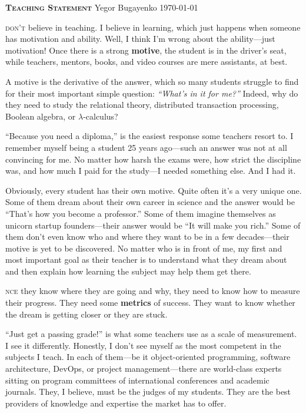 \documentclass{./yb}
\newcommand\first[2]{\vspace{1em}{\setlength{\parindent}{0pt}\bfseries\LARGE #1}\textsc{#2}}
\begin{document}
{\bfseries\scshape Teaching Statement}\newline
Yegor Bugayenko\newline
\today

\vspace*{12pt}

\first{I}{ don't} believe in teaching. I believe in learning, which
just happens when someone has motivation and ability.
Well, I think I'm wrong about the ability---just motivation!
Once there is a strong \textbf{motive}, the student is in the
driver's seat, while teachers, mentors, books, and video
courses are mere assistants, at best.

A motive is the derivative of the answer, which so many students
struggle to find for their most important simple
question: \emph{``What's in it for me?''}
Indeed, why do they need to study
the relational theory, distributed transaction processing,
Boolean algebra, or $\lambda$-calculus?

``Because you need a diploma,'' is the easiest response some
teachers resort to. I remember myself being a student 25 years ago---such
an answer was not at all convincing for me. No matter how harsh
the exams were, how strict the discipline was, and how much I paid
for the study---I needed something else. And I had it.

Obviously, every student has their own motive.
Quite often it's a very unique one.
Some of them dream about their own
career in science and the answer would be ``That's how you
become a professor.'' Some of them imagine themselves as unicorn startup
founders---their answer would be ``It will make you rich.''
Some of them don't even know who and where they want to be in a few
decades---their motive is yet to be discovered.
No matter who is in front of me, my first and most
important goal as their teacher is to understand what they dream about
and then explain how learning the subject may help them get there.

\first{O}{nce} they know where they are going and why, they need
to know how to measure their progress.
They need some \textbf{metrics} of success.
They want to know whether the dream is getting closer or they are stuck.

``Just get a passing grade!'' is what some teachers use as a
scale of measurement. I see it differently. Honestly, I don't see myself
as the most competent in the subjects I teach. In each of
them---be it object-oriented programming, software architecture, DevOps, or project management---there
are world-class experts sitting on program committees of international conferences and academic journals.
They, I believe, must be the judges of my students.
They are the best providers of knowledge and expertise the market has to offer.
\end{document}
